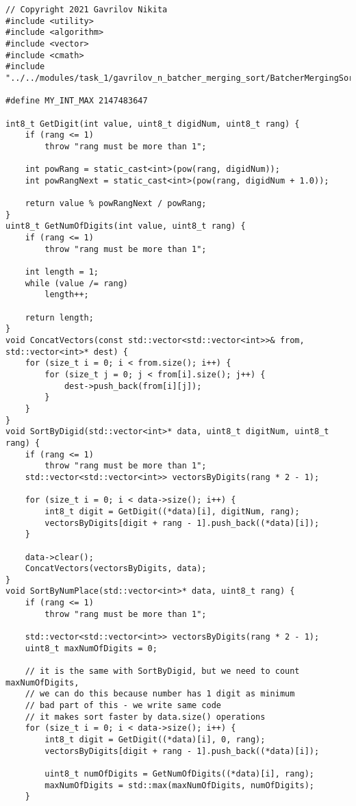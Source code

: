 \documentclass{report}
\begin{document}
\begin{lstlisting}
// Copyright 2021 Gavrilov Nikita
#include <utility>
#include <algorithm>
#include <vector>
#include <cmath>
#include "../../modules/task_1/gavrilov_n_batcher_merging_sort/BatcherMergingSort.h"

#define MY_INT_MAX 2147483647

int8_t GetDigit(int value, uint8_t digidNum, uint8_t rang) {
    if (rang <= 1)
        throw "rang must be more than 1";

    int powRang = static_cast<int>(pow(rang, digidNum));
    int powRangNext = static_cast<int>(pow(rang, digidNum + 1.0));

    return value % powRangNext / powRang;
}
uint8_t GetNumOfDigits(int value, uint8_t rang) {
    if (rang <= 1)
        throw "rang must be more than 1";

    int length = 1;
    while (value /= rang)
        length++;

    return length;
}
void ConcatVectors(const std::vector<std::vector<int>>& from, std::vector<int>* dest) {
    for (size_t i = 0; i < from.size(); i++) {
        for (size_t j = 0; j < from[i].size(); j++) {
            dest->push_back(from[i][j]);
        }
    }
}
void SortByDigid(std::vector<int>* data, uint8_t digitNum, uint8_t rang) {
    if (rang <= 1)
        throw "rang must be more than 1";
    std::vector<std::vector<int>> vectorsByDigits(rang * 2 - 1);

    for (size_t i = 0; i < data->size(); i++) {
        int8_t digit = GetDigit((*data)[i], digitNum, rang);
        vectorsByDigits[digit + rang - 1].push_back((*data)[i]);
    }

    data->clear();
    ConcatVectors(vectorsByDigits, data);
}
void SortByNumPlace(std::vector<int>* data, uint8_t rang) {
    if (rang <= 1)
        throw "rang must be more than 1";

    std::vector<std::vector<int>> vectorsByDigits(rang * 2 - 1);
    uint8_t maxNumOfDigits = 0;

    // it is the same with SortByDigid, but we need to count maxNumOfDigits,
    // we can do this because number has 1 digit as minimum
    // bad part of this - we write same code
    // it makes sort faster by data.size() operations
    for (size_t i = 0; i < data->size(); i++) {
        int8_t digit = GetDigit((*data)[i], 0, rang);
        vectorsByDigits[digit + rang - 1].push_back((*data)[i]);

        uint8_t numOfDigits = GetNumOfDigits((*data)[i], rang);
        maxNumOfDigits = std::max(maxNumOfDigits, numOfDigits);
    }


\end{lstlisting}
\end{document}
